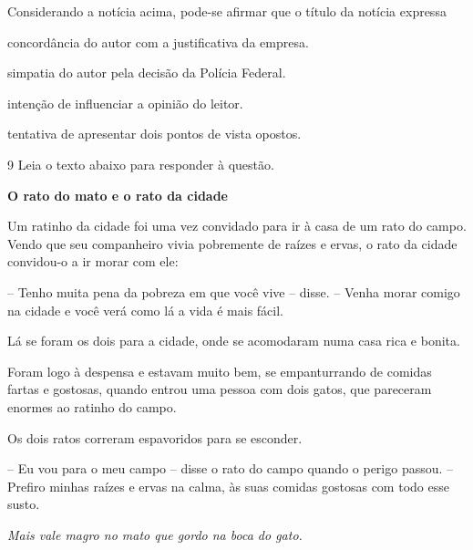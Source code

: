 
Considerando a notícia acima, pode-se afirmar que o título da notícia expressa

\begin{escolha}

    \item concordância do autor com a justificativa da empresa. 

    \item simpatia do autor pela decisão da Polícia Federal.  

    \item intenção de influenciar a opinião do leitor.  

    \item tentativa de apresentar dois pontos de vista opostos. 

\end{escolha}

\num{9} Leia o texto abaixo para responder à questão. 

\begin{myquote}

\textbf{O rato do mato e o rato da cidade}

Um ratinho da cidade foi uma vez convidado para ir à casa
de um rato do campo. Vendo que seu companheiro vivia pobremente de
raízes e ervas, o rato da cidade convidou-o a ir morar com ele:

-- Tenho muita pena da pobreza em que você vive --
disse. -- Venha morar comigo na cidade e você verá como lá a
vida é mais fácil.

Lá se foram os dois para a cidade, onde se acomodaram
numa casa rica e bonita.

Foram logo à despensa e estavam muito bem, se
empanturrando de comidas fartas e gostosas, quando entrou uma
pessoa com dois gatos, que pareceram enormes ao ratinho do
campo.

Os dois ratos correram espavoridos para se esconder.

-- Eu vou para o meu campo -- disse o rato do campo
quando o perigo passou. -- Prefiro minhas raízes e ervas na
calma, às suas comidas gostosas com todo esse susto.

\textit{Mais vale magro no mato que gordo na boca do gato.} 

\end{myquote}

